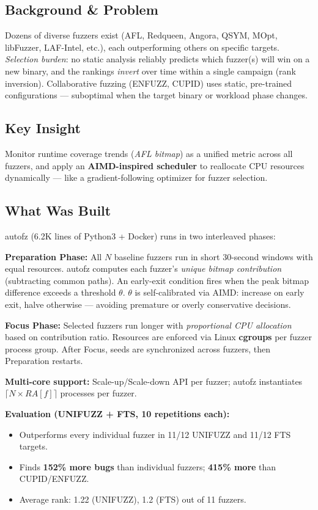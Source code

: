 \documentclass[11pt,letterpaper]{article}
\begin{document}
\subsection*{Background \& Problem}
Dozens of diverse fuzzers exist (AFL, Redqueen, Angora, QSYM, MOpt, libFuzzer, LAF-Intel, etc.), each outperforming others on specific targets.
\emph{Selection burden}: no static analysis reliably predicts which fuzzer(s) will win on a new binary, and the rankings \emph{invert} over time within a single campaign (rank inversion).
Collaborative fuzzing (ENFUZZ, CUPID) uses static, pre-trained configurations — suboptimal when the target binary or workload phase changes.

\subsection*{Key Insight}
Monitor runtime coverage trends (\emph{AFL bitmap}) as a unified metric across all fuzzers, and apply an \textbf{AIMD-inspired scheduler} to reallocate CPU resources dynamically — like a gradient-following optimizer for fuzzer selection.

\subsection*{What Was Built}
autofz (6.2K lines of Python3 + Docker) runs in two interleaved phases:

\textbf{Preparation Phase:}
All $N$ baseline fuzzers run in short 30-second windows with equal resources.
autofz computes each fuzzer's \emph{unique bitmap contribution} (subtracting common paths).
An early-exit condition fires when the peak bitmap difference exceeds a threshold $\theta$.
$\theta$ is self-calibrated via AIMD: increase on early exit, halve otherwise — avoiding premature or overly conservative decisions.

\textbf{Focus Phase:}
Selected fuzzers run longer with \emph{proportional CPU allocation} based on contribution ratio.
Resources are enforced via Linux \textbf{cgroups} per fuzzer process group.
After Focus, seeds are synchronized across fuzzers, then Preparation restarts.

\textbf{Multi-core support:} Scale-up/Scale-down API per fuzzer; autofz instantiates $\lceil N \times RA[f] \rceil$ processes per fuzzer.

\textbf{Evaluation (UNIFUZZ + FTS, 10 repetitions each):}
\begin{itemize}
    \item Outperforms every individual fuzzer in 11/12 UNIFUZZ and 11/12 FTS targets.
    \item Finds \textbf{152\% more bugs} than individual fuzzers; \textbf{415\% more} than CUPID/ENFUZZ.
    \item Average rank: 1.22 (UNIFUZZ), 1.2 (FTS) out of 11 fuzzers.
\end{itemize}
\end{document}
